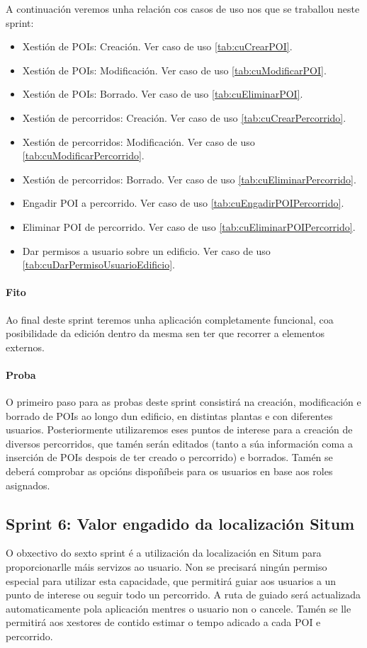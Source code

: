 A continuación veremos unha relación cos casos de uso nos que se traballou neste sprint:

\begin{itemize}
	\item Xestión de POIs: Creación. Ver caso de uso \ref{tab:cuCrearPOI}.
	\item Xestión de POIs: Modificación. Ver caso de uso \ref{tab:cuModificarPOI}.
	\item Xestión de POIs: Borrado. Ver caso de uso \ref{tab:cuEliminarPOI}.
	\item Xestión de percorridos: Creación. Ver caso de uso \ref{tab:cuCrearPercorrido}.
	\item Xestión de percorridos: Modificación. Ver caso de uso \ref{tab:cuModificarPercorrido}.
	\item Xestión de percorridos: Borrado. Ver caso de uso \ref{tab:cuEliminarPercorrido}.
	\item Engadir POI a percorrido. Ver caso de uso \ref{tab:cuEngadirPOIPercorrido}.
	\item Eliminar POI de percorrido. Ver caso de uso \ref{tab:cuEliminarPOIPercorrido}.
	\item Dar permisos a usuario sobre un edificio. Ver caso de uso \ref{tab:cuDarPermisoUsuarioEdificio}.
\end{itemize}

\paragraph{Fito}
Ao final deste sprint teremos unha aplicación completamente funcional, coa posibilidade da edición dentro da mesma sen ter que recorrer a elementos externos.

\paragraph{Proba}
O primeiro paso para as probas deste sprint consistirá na creación, modificación e borrado de POIs ao longo dun edificio, en distintas plantas e con diferentes usuarios. Posteriormente utilizaremos eses puntos de interese para a creación de diversos percorridos, que tamén serán editados (tanto a súa información coma a inserción de POIs despois de ter creado o percorrido) e borrados. Tamén se deberá comprobar as opcións dispoñíbeis para os usuarios en base aos roles asignados.


\subsection{Sprint 6: Valor engadido da localización Situm}
O obxectivo do sexto sprint é a utilización da localización en Situm para proporcionarlle máis servizos ao usuario. Non se precisará ningún permiso especial para utilizar esta capacidade, que permitirá guiar aos usuarios a un punto de interese ou seguir todo un percorrido. A ruta de guiado será actualizada automaticamente pola aplicación mentres o usuario non o cancele. Tamén se lle permitirá aos xestores de contido estimar o tempo adicado a cada POI e percorrido.

